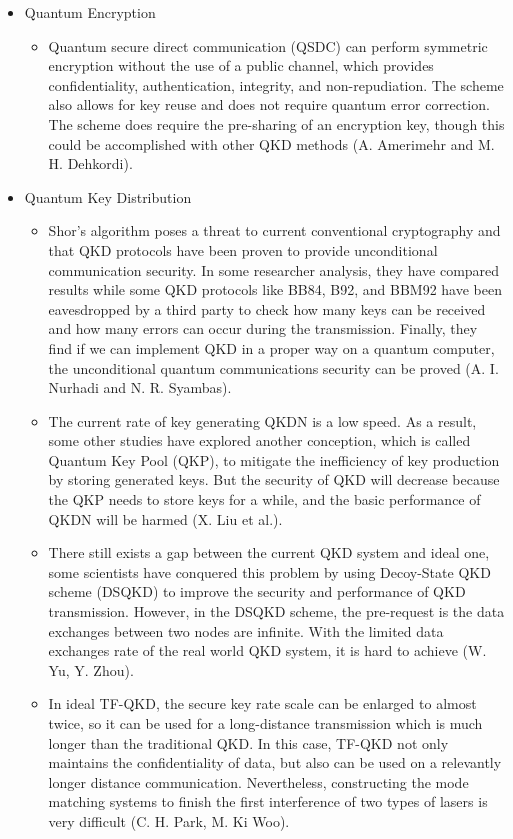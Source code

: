 \documentclass[sigconf]{acmart}
\begin{document}
\begin{itemize}
\item Quantum Encryption
    \begin{itemize}
    \item Quantum secure direct communication (QSDC) can perform symmetric encryption without the use of a public channel, which provides confidentiality, authentication, integrity, and non-repudiation. The scheme also allows for key reuse and does not require quantum error correction. The scheme does require the pre-sharing of an encryption key, though this could be accomplished with other QKD methods (A. Amerimehr and M. H. Dehkordi).
    \end{itemize}

\item Quantum Key Distribution
	\begin{itemize}
	\item Shor’s algorithm poses a threat to current conventional cryptography and that QKD protocols have been proven to provide unconditional communication security. In some researcher analysis, they have compared results while some QKD protocols like BB84, B92, and BBM92 have been eavesdropped by a third party to check how many keys can be received and how many errors can occur during the transmission. Finally, they find if we can implement QKD in a proper way on a quantum computer, the unconditional quantum communications security can be proved (A. I. Nurhadi and N. R. Syambas).
	\item The current rate of key generating QKDN is a low speed. As a result, some other studies have explored another conception, which is called Quantum Key Pool (QKP), to mitigate the inefficiency of key production by storing generated keys. But the security of QKD will decrease because the QKP needs to store keys for a while, and the basic performance of QKDN will be harmed (X. Liu et al.).
	\item There still exists a gap between the current QKD system and ideal one, some scientists have conquered this problem by using Decoy-State QKD scheme (DSQKD) to improve the security and performance of QKD transmission. However, in the DSQKD scheme, the pre-request is the data exchanges between two nodes are infinite. With the limited data exchanges rate of the real world QKD system, it is hard to achieve (W. Yu, Y. Zhou).
	\item In ideal TF-QKD, the secure key rate scale can be enlarged to almost twice, so it can be used for a long-distance transmission which is much longer than the traditional QKD. In this case, TF-QKD not only maintains the confidentiality of data, but also can be used on a relevantly longer distance communication. Nevertheless, constructing the mode matching systems to finish the first interference of two types of lasers is very difficult (C. H. Park, M. Ki Woo).
	\end{itemize}


\end{itemize}
\end{document}
